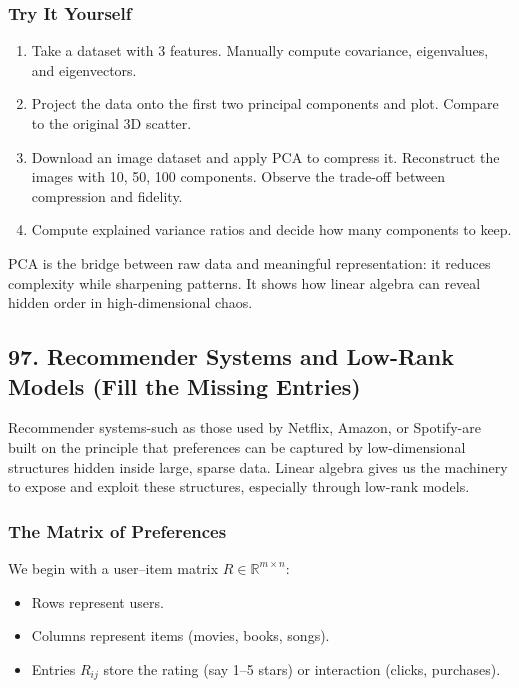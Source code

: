 \documentclass[
  letterpaper,
  DIV=11,
  numbers=noendperiod]{scrreprt}
\providecommand{\tightlist}{%
  \setlength{\itemsep}{0pt}\setlength{\parskip}{0pt}}
\begin{document}
\subsubsection{Try It Yourself}\label{try-it-yourself-95}

\begin{enumerate}
\def\labelenumi{\arabic{enumi}.}
\tightlist
\item
  Take a dataset with 3 features. Manually compute covariance,
  eigenvalues, and eigenvectors.
\item
  Project the data onto the first two principal components and plot.
  Compare to the original 3D scatter.
\item
  Download an image dataset and apply PCA to compress it. Reconstruct
  the images with 10, 50, 100 components. Observe the trade-off between
  compression and fidelity.
\item
  Compute explained variance ratios and decide how many components to
  keep.
\end{enumerate}

PCA is the bridge between raw data and meaningful representation: it
reduces complexity while sharpening patterns. It shows how linear
algebra can reveal hidden order in high-dimensional chaos.

\subsection{97. Recommender Systems and Low-Rank Models (Fill the
Missing
Entries)}\label{recommender-systems-and-low-rank-models-fill-the-missing-entries}

Recommender systems-such as those used by Netflix, Amazon, or
Spotify-are built on the principle that preferences can be captured by
low-dimensional structures hidden inside large, sparse data. Linear
algebra gives us the machinery to expose and exploit these structures,
especially through low-rank models.

\subsubsection{The Matrix of
Preferences}\label{the-matrix-of-preferences}

We begin with a user--item matrix \(R \in \mathbb{R}^{m \times n}\):

\begin{itemize}
\tightlist
\item
  Rows represent users.
\item
  Columns represent items (movies, books, songs).
\item
  Entries \(R_{ij}\) store the rating (say 1--5 stars) or interaction
  (clicks, purchases).
\end{itemize}
\end{document}
